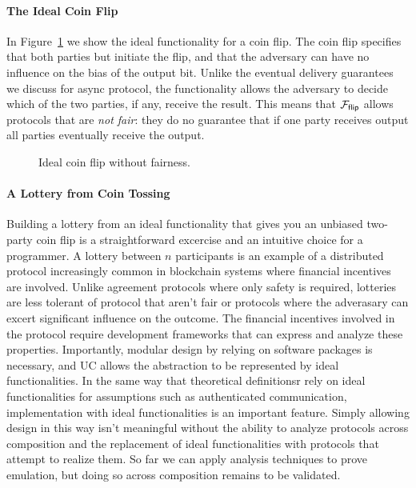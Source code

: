 \paragraph{The Ideal Coin Flip}
In Figure~\ref{fig:fflip} we show the ideal functionality for a coin flip. 
The coin flip specifies that both parties but initiate the flip, and that the adversary can have no influence on the bias of the output bit.
Unlike the eventual delivery guarantees we discuss for async protocol, the functionality allows the adversary to decide which of the two parties, if any, receive the result.
This means that $\mathcal{F}_{{\mathsf {flip}}}$ allows protocols that are \emph{not fair}: they do no guarantee that if one party receives output all parties eventually receive the output. 
\begin{figure}
\centering

\caption{Ideal coin flip without fairness.}
\label{fig:fflip}
\end{figure}

\paragraph{A Lottery from Coin Tossing}

Building a lottery from an ideal functionality that gives you an unbiased two-party coin flip is a straightforward excercise and an intuitive choice for a programmer. 
A lottery between $n$ participants is an example of a distributed protocol increasingly common in blockchain systems where financial incentives are involved.
Unlike agreement protocols where only safety is required, lotteries are less tolerant of protocol that aren't fair or protocols where the adverasary can excert significant influence on the outcome. 
The financial incentives involved in the protocol require development frameworks that can express and analyze these properties.
Importantly, modular design by relying on software packages is necessary, and UC allows the abstraction to be represented by ideal functionalities.
In the same way that theoretical definitionsr rely on ideal functionalities for assumptions such as authenticated communication, implementation with ideal functionalities is an important feature.
Simply allowing design in this way isn't meaningful without the ability to analyze protocols across composition and the replacement of ideal functionalities with protocols that attempt to realize them.
So far we can apply analysis techniques to prove emulation, but doing so across composition remains to be validated.

